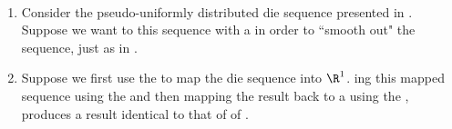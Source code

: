 \begin{example}
\label{ex:fdie_lp}\mbox{}\\
\begin{enumerate}
  \item \label{item:fdie_lp_seq}
     Consider the pseudo-uniformly distributed die sequence presented in .
     Suppose we want to  %
     this sequence with a
     in order to ``smooth out" the sequence, just as in .

  \item \label{item:fdie_lp_R1_rect16_euclid}
        Suppose we first use the   
        to map the die sequence into $\R^1$.
        ing this mapped sequence using the  
        and then mapping the result back to a  %
        using the , produces a result identical to that of 
         of .
  


\end{enumerate}
\end{example}
